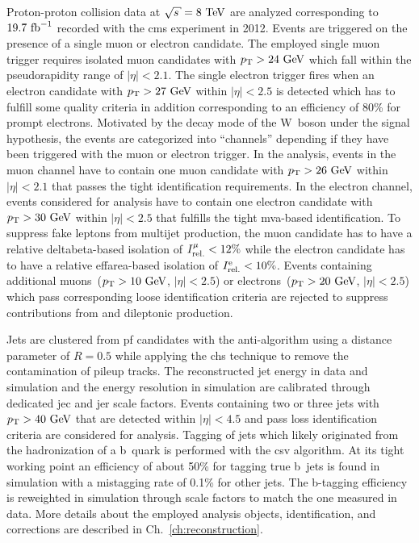 Proton-proton collision data at $\sqrt{s}=8~\TeV$ are analyzed corresponding to $19.7~\mathrm{fb}^{-1}$ recorded with the \gls{cms} experiment in 2012. Events are triggered on the presence of a single muon or electron candidate. The employed single muon trigger requires isolated muon candidates with $p_\mathrm{T}>24~\mathrm{GeV}$ which fall within the pseudorapidity range of $|\eta|<2.1$. The single electron trigger fires when an electron candidate with $p_\mathrm{T}>27~\mathrm{GeV}$ within $|\eta|<2.5$ is detected which has to fulfill some quality criteria in addition corresponding to an efficiency of 80\% for prompt electrons. Motivated by the decay mode of the W~boson under the signal hypothesis, the events are categorized into ``channels'' depending if they have been triggered with the muon or electron trigger. In the analysis, events in the muon channel have to contain one muon candidate with $p_\mathrm{T}>26~\mathrm{GeV}$ within $|\eta|<2.1$ that passes the tight identification requirements. In the electron channel, events considered for analysis have to contain one electron candidate with $p_\mathrm{T}>30~\mathrm{GeV}$ within $|\eta|<2.5$ that fulfills the tight \gls{mva}-based  identification. To suppress fake leptons from multijet production, the muon candidate has to have a relative \gls{deltabeta}-based isolation of $I_\mathrm{rel.}^{\mu}<12\%$ while the electron candidate has to have a relative \gls{effarea}-based isolation of $I_\mathrm{rel.}^\mathrm{e}<10\%$. Events containing additional muons~($p_\mathrm{T}>10~\mathrm{GeV}$, $|\eta|<2.5$) or electrons~($p_\mathrm{T}>20~\mathrm{GeV}$, $|\eta|<2.5$) which pass corresponding loose identification criteria are rejected to suppress contributions from \zjets and dileptonic \ttbar production. 

Jets are clustered from \gls{pf} candidates with the anti-\kt algorithm using a distance parameter of $R=0.5$ while applying the \gls{chs} technique to remove the contamination of pileup tracks. The reconstructed jet energy in data and simulation and the energy resolution in simulation are calibrated through dedicated \gls{jec} and \gls{jer} scale factors. Events containing two or three jets with $p_\mathrm{T}>40~\mathrm{GeV}$ that are detected within $|\eta|<4.5$ and pass loss identification criteria are considered for analysis. Tagging of jets which likely originated from the hadronization of a b~quark is performed with the \gls{csv} algorithm. At its tight working point an efficiency of about 50\% for tagging true b~jets is found in simulation with a mistagging rate of 0.1\% for other jets. The b-tagging efficiency is reweighted in simulation through scale factors to match the one measured in data. More details about the employed analysis objects, identification, and corrections are described in Ch.~\ref{ch:reconstruction}.

